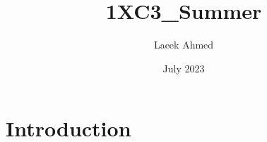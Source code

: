 \documentclass{article}
\title{1XC3_Summer}
\author{Laeek Ahmed}
\date{July 2023}
\begin{document}
\maketitle

\section{Introduction}
\end{document}
